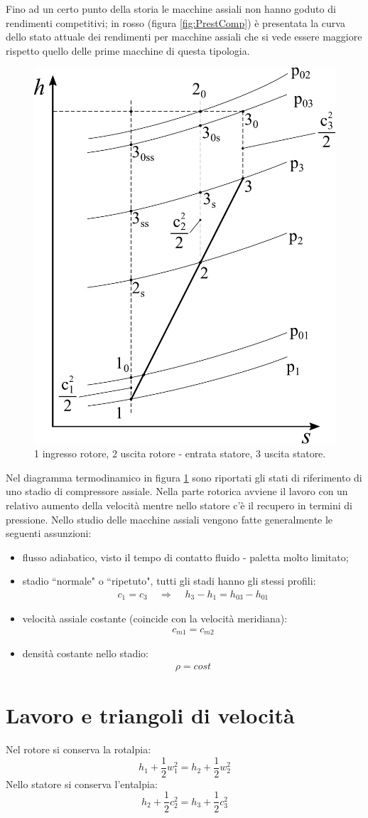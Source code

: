 Fino ad un certo punto della storia le macchine assiali non hanno goduto di rendimenti competitivi; in rosso (figura \ref{fig:PrestComp}) è presentata la curva dello stato attuale dei rendimenti per macchine assiali che si vede essere maggiore rispetto quello delle prime macchine di questa tipologia. 
\begin{figure}
\centering
  \includegraphics[width=.4\textwidth]{fig/hsComp.pdf}
\caption{1 ingresso rotore, 2 uscita rotore - entrata statore, 3 uscita statore.}
\label{fig:hsComp}
\end{figure}

Nel diagramma termodinamico in figura \ref{fig:hsComp} sono riportati gli stati di riferimento di uno stadio di compressore assiale. Nella parte rotorica avviene il lavoro con un relativo aumento della velocità mentre nello statore c'è il recupero in termini di pressione. Nello studio delle macchine assiali vengono fatte generalmente le seguenti assunzioni:
\begin{itemize}
\item flusso adiabatico, visto il tempo di contatto fluido - paletta molto limitato;
\item stadio ``normale" o ``ripetuto", tutti gli stadi hanno gli stessi profili:
\begin{align*}
c_1 = c_3 \;\;\;\; \Rightarrow \;\;\;\; h_3-h_1 = h_{03} - h_{01}
\end{align*}
\item velocità assiale costante (coincide con la velocità meridiana):
\begin{align*}
c_{m1} = c_{m2}
\end{align*}
\item densità costante nello stadio:
\begin{align*}
\rho = cost
\end{align*}
\end{itemize}
\section{Lavoro e triangoli di velocità}
Nel rotore si conserva la rotalpia:
\begin{equation}
h_1 + \frac{1}{2} w_1^2 = h_2 + \frac{1}{2} w_2^2
\end{equation}
Nello statore si conserva l'entalpia:
\begin{equation}
h_2 + \frac{1}{2} c_2^2 = h_3 + \frac{1}{2} c_3^2
\end{equation}

